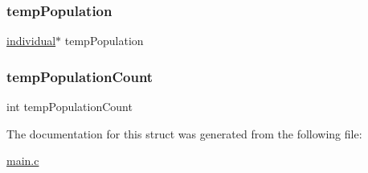 \subsubsection{\texorpdfstring{temp\+Population}{tempPopulation}}
{\footnotesize\ttfamily \hyperlink{structindividual}{individual}$\ast$ temp\+Population}

\hypertarget{structparams_a9af1335fe713a9463db9a4cfa7040504}{}\label{structparams_a9af1335fe713a9463db9a4cfa7040504} 
\subsubsection{\texorpdfstring{temp\+Population\+Count}{tempPopulationCount}}
{\footnotesize\ttfamily int temp\+Population\+Count}



The documentation for this struct was generated from the following file\+:\begin{DoxyCompactItemize}
\item 
\hyperlink{main_8c}{main.\+c}\end{DoxyCompactItemize}
